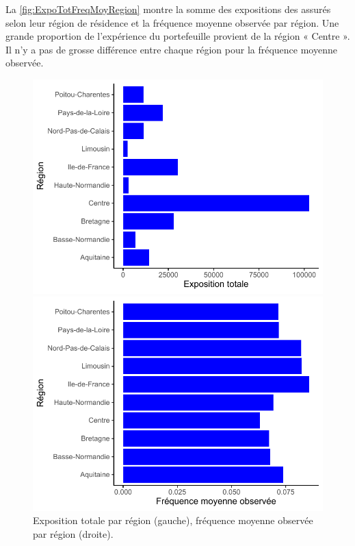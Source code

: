 La \autoref{fig:ExpoTotFreqMoyRegion} montre la somme des expositions des assurés selon leur région de résidence et la fréquence moyenne observée par région. Une grande proportion de l'expérience du portefeuille provient de la région « Centre ». Il n'y a pas de grosse différence entre chaque région pour la fréquence moyenne observée. 


\begin{figure}
\caption{\label{fig:ExpoTotFreqMoyRegion} Exposition totale par région (gauche), fréquence moyenne observée par région (droite).}
\centering
\begin{minipage}{0.4\linewidth}
\includegraphics[scale=0.5]{Graphiques/ExpoTotRegion}
\end{minipage}
\hfill
\begin{minipage}{0.4\linewidth}
\includegraphics[scale=0.5]{Graphiques/FreqMoyRegion}
\end{minipage}
\end{figure}

